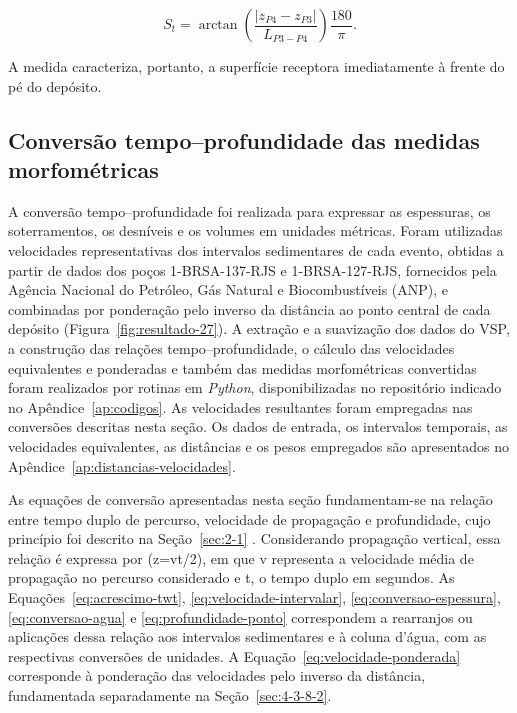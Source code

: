 \begin{equation}
  S_t=\arctan\!\left(\frac{\lvert z_{P4}-z_{P3}\rvert}{L_{P3-P4}}\right)\frac{180}{\pi}.
  \label{eq:inclinacao-superficie-receptora}
\end{equation}

A medida caracteriza, portanto, a superfície receptora imediatamente à frente do pé do depósito.

\subsection{Conversão tempo--profundidade das medidas morfométricas}\label{sec:4-3-8}

A conversão tempo--profundidade foi realizada para expressar as espessuras, os soterramentos, os desníveis e os volumes em unidades métricas. Foram utilizadas velocidades representativas dos intervalos sedimentares de cada evento, obtidas a partir de dados dos poços 1-BRSA-137-RJS e 1-BRSA-127-RJS, fornecidos pela Agência Nacional do Petróleo, Gás Natural e Biocombustíveis (ANP), e combinadas por ponderação pelo inverso da distância ao ponto central de cada depósito (Figura~\ref{fig:resultado-27}). A extração e a suavização dos dados do VSP, a construção das relações tempo--profundidade, o cálculo das velocidades equivalentes e ponderadas e também das medidas morfométricas convertidas foram realizados por rotinas em \textit{Python}, disponibilizadas no repositório indicado no Apêndice~\ref{ap:codigos}. As velocidades resultantes foram empregadas nas conversões descritas nesta seção. Os dados de entrada, os intervalos temporais, as velocidades equivalentes, as distâncias e os pesos empregados são apresentados no Apêndice~\ref{ap:distancias-velocidades}.

As equações de conversão apresentadas nesta seção fundamentam-se na relação entre tempo duplo de percurso, velocidade de propagação e profundidade, cujo princípio foi descrito na Seção~\ref{sec:2-1} \cite{yilmaz2001}. Considerando propagação vertical, essa relação é expressa por (z=vt/2), em que v representa a velocidade média de propagação no percurso considerado e t, o tempo duplo em segundos. As Equações~\eqref{eq:acrescimo-twt}, \eqref{eq:velocidade-intervalar}, \eqref{eq:conversao-espessura}, \eqref{eq:conversao-agua} e \eqref{eq:profundidade-ponto} correspondem a rearranjos ou aplicações dessa relação aos intervalos sedimentares e à coluna d’água, com as respectivas conversões de unidades. A Equação~\eqref{eq:velocidade-ponderada} corresponde à ponderação das velocidades pelo inverso da distância, fundamentada separadamente na Seção~\ref{sec:4-3-8-2}.

